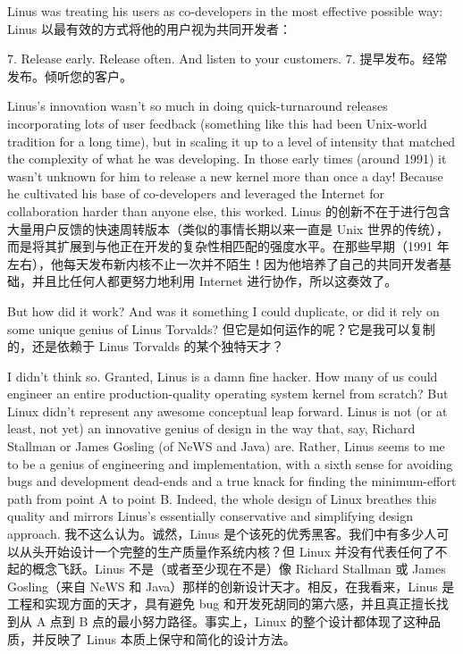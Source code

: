 \documentclass[a4paper,12pt,UTF8,twoside]{ctexbook}
\begin{document}
Linus was treating his users as co-developers in the most effective possible way:
Linus 以最有效的方式将他的用户视为共同开发者：

7. Release early. Release often. And listen to your customers.
7. 提早发布。经常发布。倾听您的客户。

Linus's innovation wasn't so much in doing quick-turnaround releases incorporating lots of user feedback (something like this had been Unix-world tradition for a long time), but in scaling it up to a level of intensity that matched the complexity of what he was developing. In those early times (around 1991) it wasn't unknown for him to release a new kernel more than once a day! Because he cultivated his base of co-developers and leveraged the Internet for collaboration harder than anyone else, this worked.
Linus 的创新不在于进行包含大量用户反馈的快速周转版本（类似的事情长期以来一直是 Unix 世界的传统），而是将其扩展到与他正在开发的复杂性相匹配的强度水平。在那些早期（1991 年左右），他每天发布新内核不止一次并不陌生！因为他培养了自己的共同开发者基础，并且比任何人都更努力地利用 Internet 进行协作，所以这奏效了。

But how did it work? And was it something I could duplicate, or did it rely on some unique genius of Linus Torvalds?
但它是如何运作的呢？它是我可以复制的，还是依赖于 Linus Torvalds 的某个独特天才？

I didn't think so. Granted, Linus is a damn fine hacker. How many of us could engineer an entire production-quality operating system kernel from scratch? But Linux didn't represent any awesome conceptual leap forward. Linus is not (or at least, not yet) an innovative genius of design in the way that, say, Richard Stallman or James Gosling (of NeWS and Java) are. Rather, Linus seems to me to be a genius of engineering and implementation, with a sixth sense for avoiding bugs and development dead-ends and a true knack for finding the minimum-effort path from point A to point B. Indeed, the whole design of Linux breathes this quality and mirrors Linus's essentially conservative and simplifying design approach.
我不这么认为。诚然，Linus 是个该死的优秀黑客。我们中有多少人可以从头开始设计一个完整的生产质量作系统内核？但 Linux 并没有代表任何了不起的概念飞跃。Linus 不是（或者至少现在不是）像 Richard Stallman 或 James Gosling（来自 NeWS 和 Java）那样的创新设计天才。相反，在我看来，Linus 是工程和实现方面的天才，具有避免 bug 和开发死胡同的第六感，并且真正擅长找到从 A 点到 B 点的最小努力路径。事实上，Linux 的整个设计都体现了这种品质，并反映了 Linus 本质上保守和简化的设计方法。
\end{document}
